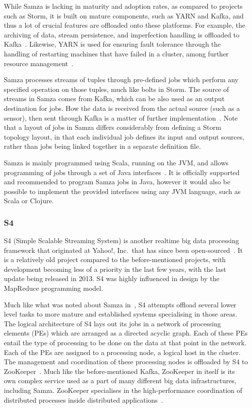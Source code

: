While Samza is lacking in maturity and adoption rates, as compared to projects such as Storm, it is built on mature
components, such as YARN and Kafka, and thus a lot of crucial features are offloaded onto these platforms. For example,
the archiving of data, stream persistence, and imperfection handling is offloaded to Kafka~\cite{bockermann2014survey}.
Likewise, YARN is used for ensuring fault tolerance through the handling of restarting machines that have failed in a
cluster, among further resource management~\cite{bockermann2014survey}.

Samza processes streams of tuples through pre-defined jobs which perform any specified operation on those tuples, much
like bolts in Storm. The source of streams in Samza comes from Kafka, which can be also used as an output destination
for jobs. How the data is received from the actual source (such as a sensor), then sent through Kafka is a matter of
further implementation~\cite{yangradstack}. Note that a layout of jobs in Samza differs considerably from defining
a Storm topology layout, in that each individual job defines its input and output sources, rather than jobs being
linked together in a separate definition file.

Samza is mainly programmed using Scala, running on the JVM, and allows programming of jobs through a set of Java
interfaces~\cite{Samza6:online}. It is officially supported and recommended to program Samza jobs in Java, however it
would also be possible to implement the provided interfaces using any JVM language, such as Scala or Clojure.



\subsubsection{S4} %
\label{ssub:s4}

S4 (Simple Scalable Streaming System) is another realtime big data processing framework that originated at Yahoo!, Inc.\
that has since been open-sourced~\cite{neumeyer2010s4}. It is a relatively old project compared to the before-mentioned
projects, with development becoming less of a priority in the last few years, with the last update being released in 2013.
S4 was highly influenced in design by the MapReduce programming model.

Much like what was noted about Samza in~, S4 attempts offload several lower level tasks to more
mature and established systems specialising in those areas. The logical architecture of S4 lays out its jobs in a
network of processing elements (PEs) which are arranged as a directed acyclic graph. Each of these PEs entail the type
of processing to be done on the data at that point in the network. Each of the PEs are assigned to a processing node, a
logical host in the cluster. The management and coordination of these processing nodes is offloaded by S4 to
ZooKeeper~\cite{kamburugamuve_survey_2014}. Much like the before-mentioned Kafka, ZooKeeper in itself is its own complex
service used as a part of many different big data infrastructures, including Samza. ZooKeeper specialises in the
high-performance coordination of distributed processes inside distributed applications~\cite{hunt2010zookeeper}.

